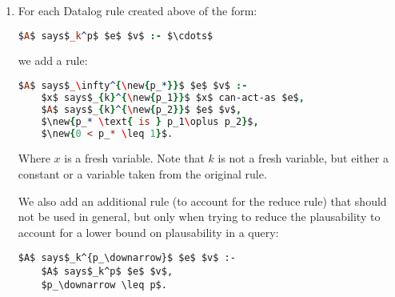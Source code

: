 \documentclass[a4paper]{article}
\newcommand{\new}[1]{{\color{BrickRed} #1}}
\begin{document}
\begin{enumerate}
  \item
    For each Datalog rule created above of the form:
    \begin{lstlisting}[language=Prolog]
      $A$ says$_k^p$ $e$ $v$ :- $\cdots$
    \end{lstlisting}
    we add a rule:

    \begin{lstlisting}[language=Prolog]
$A$ says$_\infty^{\new{p_*}}$ $e$ $v$ :-
    $x$ says$_{k}^{\new{p_1}}$ $x$ can-act-as $e$,
    $A$ says$_{k}^{\new{p_2}}$ $e$ $v$,
    $\new{p_* \text{ is } p_1\oplus p_2}$, 
    $\new{0 < p_* \leq 1}$.
    \end{lstlisting}
    Where $x$ is a fresh variable.  Note that $k$ is not a fresh variable, but either a constant or a variable taken from the original rule.
    

    \new{
      We also add an additional rule (to account for the reduce rule)
      that should not be used in general, but only when trying to reduce the
      plausability to account for a lower bound on plausability in a query:
      }
      
      \begin{lstlisting}[basicstyle=\color{BrickRed}\ttfamily]
$A$ says$_k^{p_\downarrow}$ $e$ $v$ :- 
    $A$ says$_k^p$ $e$ $v$,
    $p_\downarrow \leq p$.
      \end{lstlisting}
\end{enumerate}
\end{document}
